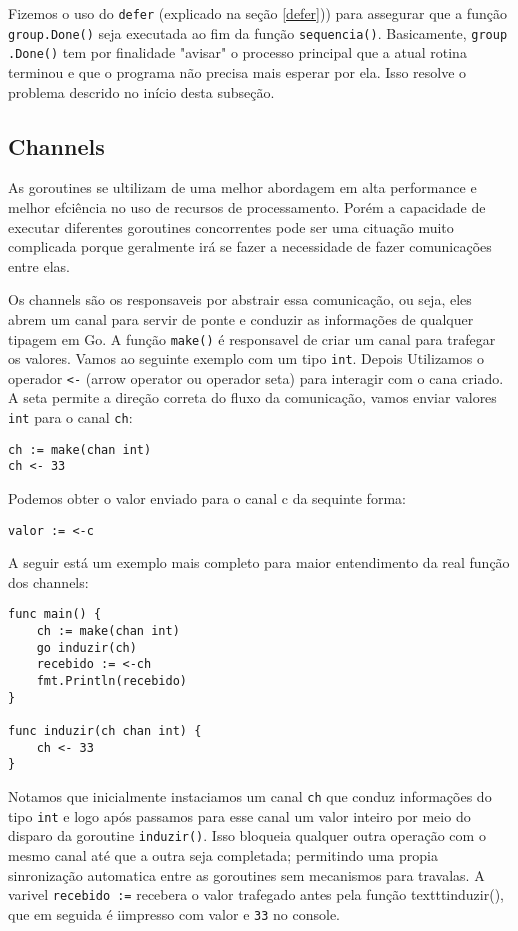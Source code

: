 \documentclass{SBCbookchapter}
\begin{document}
Fizemos o uso do \texttt{defer} (explicado na seção \ref{defer})) para assegurar que a função \texttt{group.Done()} seja executada ao fim da função \texttt{sequencia()}. Basicamente, \texttt{group\\.Done()} tem por finalidade "avisar" o processo principal que a atual rotina terminou e que o programa não precisa mais esperar por ela. Isso resolve o problema descrido no início desta subseção.

\subsection{Channels}
As goroutines se ultilizam de uma melhor abordagem em alta performance e melhor efciência no uso de recursos de processamento. Porém a capacidade de executar diferentes goroutines concorrentes pode ser uma cituação muito complicada porque geralmente irá se fazer a necessidade de fazer comunicações entre elas.

Os channels são os responsaveis por abstrair essa comunicação, ou seja, eles abrem um canal para servir de ponte e conduzir as informações de qualquer tipagem em Go. A função \texttt{make()} é responsavel de criar um canal para trafegar os valores. Vamos ao seguinte exemplo com um tipo \texttt{int}. Depois Utilizamos o operador \texttt{<-} (arrow operator ou operador seta) para interagir com o cana criado. A seta permite a direção correta do fluxo da comunicação, vamos enviar valores \texttt{int} para o canal \texttt{ch}:

\begin{lstlisting}
ch := make(chan int)
ch <- 33
\end{lstlisting}


Podemos obter o valor enviado para o canal c da sequinte forma:

\begin{lstlisting}
valor := <-c
\end{lstlisting}

A seguir está um exemplo mais completo para maior entendimento da real função dos channels:

\begin{lstlisting}
func main() {
	ch := make(chan int)
	go induzir(ch)
	recebido := <-ch
	fmt.Println(recebido)
}

func induzir(ch chan int) {
	ch <- 33
}
\end{lstlisting}

Notamos que inicialmente instaciamos um canal \texttt{ch} que conduz informações do tipo \texttt{int} e logo após passamos para esse canal um valor inteiro por meio do disparo da goroutine \texttt{induzir()}. Isso bloqueia qualquer outra operação com o mesmo canal até que a outra seja completada; permitindo uma propia sinronização automatica entre as goroutines sem mecanismos para travalas. A varivel \texttt{recebido :=} recebera o valor trafegado antes pela função texttt{induzir()}, que em seguida é iimpresso com valor e \texttt{33} no console.
\end{document}

